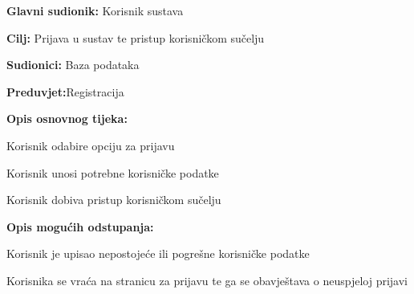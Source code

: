 					
					\noindent {}
					\begin{packed_item}
						
						\item \textbf{Glavni sudionik: } Korisnik sustava
						\item  \textbf{Cilj:} Prijava u sustav te pristup korisničkom sučelju
						\item  \textbf{Sudionici:} Baza podataka
						\item  \textbf{Preduvjet:}Registracija
						\item  \textbf{Opis osnovnog tijeka:}
						
						\item[] \begin{packed_enum}
							
							\item Korisnik odabire opciju za prijavu
							\item Korisnik unosi potrebne korisničke podatke
							\item Korisnik dobiva pristup korisničkom sučelju
						\end{packed_enum}
						
						\item  \textbf{Opis mogućih odstupanja:}
						
						\item[] \begin{packed_item}
							
							\item[2.a] Korisnik je upisao nepostojeće ili pogrešne korisničke podatke
							\item[] \begin{packed_enum}
								\item Korisnika se vraća na stranicu za prijavu te ga se obavještava o neuspjeloj prijavi
							\end{packed_enum}	
						\end{packed_item}
					\end{packed_item}
				
